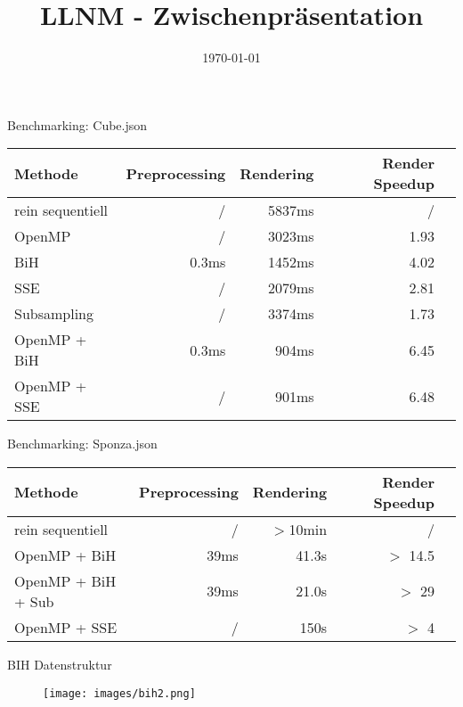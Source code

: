 


\title[LLNM]{LLNM - Zwischenpräsentation}
\subtitle{}
\date{\today}

	\begin{frame}
		\titlepage
	\end{frame}
	\begin{frame}{Benchmarking: Cube.json}
		\begin{tabular}{l*{4}{r}}
		Methode           & Preprocessing & Rendering & Render Speedup \\%
		\hline
		rein sequentiell  & /      & 5837ms & /      \\%
		OpenMP            & /      & 3023ms & 1.93   \\%
		BiH               & 0.3ms  & 1452ms & 4.02   \\%
		SSE               & /      & 2079ms & 2.81   \\%
		Subsampling       & /      & 3374ms & 1.73   \\%
		OpenMP + BiH      & 0.3ms  &  904ms & 6.45   \\%
		OpenMP + SSE      & /      &  901ms & 6.48   \\%
		\end{tabular}
	\end{frame}
	\begin{frame}{Benchmarking: Sponza.json}
		\begin{tabular}{l*{4}{r}}
		Methode           & Preprocessing & Rendering & Render Speedup \\%
		\hline
		rein sequentiell  & /      & $>$10min & /        \\
		OpenMP + BiH      & 39ms   & 41.3s    & $>$ 14.5 \\
		OpenMP + BiH + Sub  & 39ms   & 21.0s    & $>$ 29 \\
		OpenMP + SSE      & /      & 150s     & $>$ 4    \\
		\end{tabular}
	\end{frame}
	\begin{frame}{BIH Datenstruktur}
		\begin{figure}[ht]
		\texttt{[image: images/bih2.png]}
		\end{figure}
	\end{frame}

